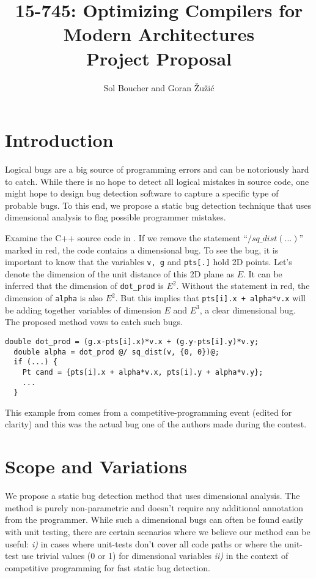 \documentclass[12pt]{article}
\title{{\small 15-745: Optimizing Compilers for Modern Architectures} \\ Project Proposal}
\author{Sol Boucher and Goran \v{Z}u\v{z}i\'c}
\begin{document}
\maketitle

\section{Introduction}

Logical bugs are a big source of programming errors and can be notoriously hard to catch. While there is no hope to detect all logical mistakes in source code, one might hope to design bug detection software to capture a specific type of probable bugs. To this end, we propose a static bug detection technique that uses dimensional analysis to flag possible programmer mistakes.

Examine the C++ source code in . If we remove the statement ``\texttt{$/ sq\_dist(...)$}'' marked in red, the code contains a dimensional bug. To see the bug, it is important to know that the variables \texttt{v, g} and \texttt{pts[.]} hold 2D points. Let's denote the dimension of the unit distance of this 2D plane as $E$. It can be inferred that the dimension of \texttt{dot\_prod} is $E^2$. Without the statement in red, the dimension of \texttt{alpha} is also $E^2$. But this implies that \texttt{pts[i].x + alpha*v.x} will be adding together variables of dimension $E$ and $E^3$, a clear dimensional bug. The proposed method vows to catch such bugs.

\begin{lstlisting}[label=code:example1,caption=Example of a dimensional bug]
  double dot_prod = (g.x-pts[i].x)*v.x + (g.y-pts[i].y)*v.y;
  double alpha = dot_prod @/ sq_dist(v, {0, 0})@;
  if (...) {
    Pt cand = {pts[i].x + alpha*v.x, pts[i].y + alpha*v.y};
    ...
  }
\end{lstlisting}

This example from  comes from a competitive-programming event (edited for clarity) and this was the actual bug one of the authors made during the contest. %

\section{Scope and Variations}

We propose a static bug detection method that uses dimensional analysis. The method is purely non-parametric and doesn't require any additional annotation from the programmer. While such a dimensional bugs can often be found easily with unit testing, there are certain scenarios where we believe our method can be useful: \textit{i)} in cases where unit-tests don't cover all code paths or where the unit-test use trivial values (0 or 1) for dimensional variables \textit{ii)} in the context of competitive programming for fast static bug detection.
\end{document}
